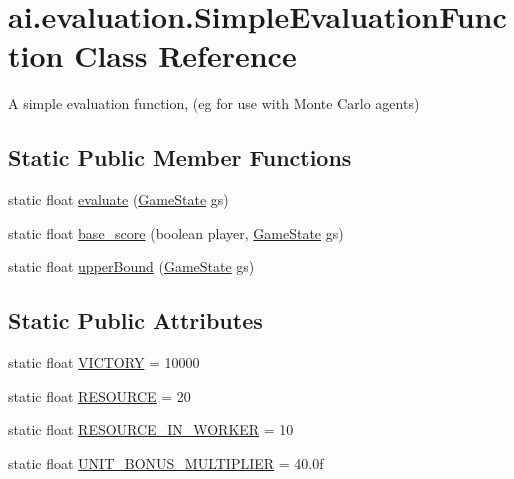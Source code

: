 \hypertarget{classai_1_1evaluation_1_1_simple_evaluation_function}{
\section{ai.evaluation.SimpleEvaluationFunction Class Reference}
\label{classai_1_1evaluation_1_1_simple_evaluation_function}
}


A simple evaluation function, (eg for use with Monte Carlo agents)  


\subsection*{Static Public Member Functions}
\begin{DoxyCompactItemize}
\item 
static float \hyperlink{classai_1_1evaluation_1_1_simple_evaluation_function_abd5457dfe432776c06fc3f6922c91ea3}{evaluate} (\hyperlink{classrts_1_1_game_state}{GameState} gs)
\item 
static float \hyperlink{classai_1_1evaluation_1_1_simple_evaluation_function_a9ce15eb272d9052a8670e725588f8763}{base\_\-score} (boolean player, \hyperlink{classrts_1_1_game_state}{GameState} gs)
\item 
static float \hyperlink{classai_1_1evaluation_1_1_simple_evaluation_function_a833a95d2af2eca604b681f703ecd56a1}{upperBound} (\hyperlink{classrts_1_1_game_state}{GameState} gs)
\end{DoxyCompactItemize}
\subsection*{Static Public Attributes}
\begin{DoxyCompactItemize}
\item 
static float \hyperlink{classai_1_1evaluation_1_1_simple_evaluation_function_a28bdf717b30e4142dc9c03aa0150f355}{VICTORY} = 10000
\item 
static float \hyperlink{classai_1_1evaluation_1_1_simple_evaluation_function_a61e6893396bcbd96e6da9b8f0ebe0589}{RESOURCE} = 20
\item 
static float \hyperlink{classai_1_1evaluation_1_1_simple_evaluation_function_a35e88fca78ce30a0a965b6317f399c1d}{RESOURCE\_\-IN\_\-WORKER} = 10
\item 
static float \hyperlink{classai_1_1evaluation_1_1_simple_evaluation_function_aac0348c46516798b458d605aef5103c2}{UNIT\_\-BONUS\_\-MULTIPLIER} = 40.0f
\end{DoxyCompactItemize}


